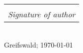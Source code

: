 \documentclass[
	10pt, %
	twoside, %
	chapterinoneline,%
	onehalfspacing, %
	nolistspacing, %
	parskip, %
	headsepline, %
	english,
]{MastersDoctoralThesis} %
\makeatletter
\newcommand{\sign}[1]{%
  \begin{tabular}[t]{@{}c@{}}
  \makebox[1.5in]{\dotfill}\\
  \strut\emph{#1}\strut%
  \end{tabular}%
}
\makeatother
\begin{document}
	\begin{flushright}
		\sign{Signature of author}\\
		Greifswald; \today
	\end{flushright}


	\tableofcontents %



	\mainmatter%
	\pagestyle{thesis} %
	
	
	
	
	
	
	\appendix %
	

	\printbibliography[heading=bibintoc]

\end{document}

